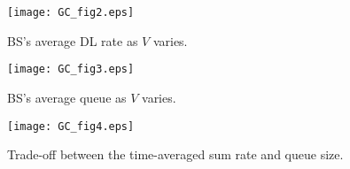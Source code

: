 \documentclass[conference]{IEEEtran}
\begin{document}
\begin{figure}[!t]
	\centering
	\vspace{-1.3em}
	\texttt{[image: GC\_fig2.eps]}	
	\vspace{-1.5em}
	\caption{BS's average DL rate as $V$ varies.}
\vspace{-1.5em}
	\label{Fig: 2}
\end{figure}
%
%
%
\begin{figure}[!t]
	\centering
	\vspace{-1.3em}
	\texttt{[image: GC\_fig3.eps]}	
	\vspace{-1.5em}
	\caption{BS's average queue  as $V$ varies.}
	\label{Fig: 3}
\end{figure}
%
%
%
%
%
%
%
\begin{figure}[!h]
	\centering
	\vspace{-1.3em}
	\texttt{[image: GC\_fig4.eps]}
	\vspace{-1.5em}
\caption{Trade-off between the time-averaged sum rate and queue size.}
	\label{Fig: R_Q_tradeoff}
		\vspace{-1.5em}
\end{figure}
%
%
%
\end{document}
